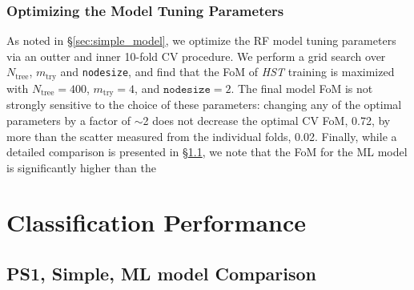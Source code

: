 \documentclass[twocolumn]{aastex62}
\begin{document}
\subsubsection{Optimizing the Model Tuning Parameters}

As noted in \S\ref{sec:simple_model}, we optimize the RF model tuning parameters via an outter and inner 10-fold CV procedure. We perform a grid search over $N_{\mathrm{tree}}$, $m_{\mathrm{try}}$ and \texttt{nodesize}, and find that the FoM of \textit{HST} training is maximized with $N_{\mathrm{tree}} = 400$, $m_{\mathrm{try}} = 4$, and $\mathtt{nodesize} = 2$. The final model FoM is not strongly sensitive to the choice of these parameters: changing any of the optimal parameters by a factor of $\sim$2 does not decrease the optimal CV FoM, 0.72, by more than the scatter measured from the individual folds, 0.02. Finally, while a detailed comparison is presented in \S\ref{sec:comp_hst}, we note that the FoM for the ML model is significantly higher than the 

\section{Classification Performance}

\subsection{PS1, Simple, ML model Comparison}\label{sec:comp_hst}
\end{document}
